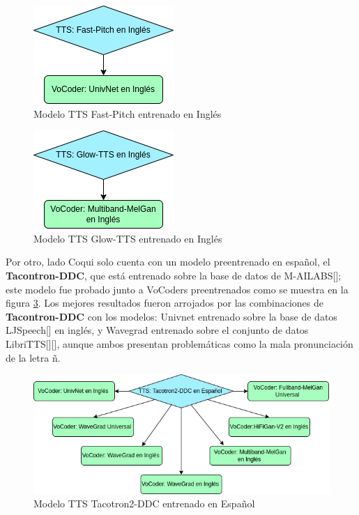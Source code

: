\begin{figure}[H]
	\centering
	\includegraphics[width=0.3\linewidth]{Graphics/en_fastpitch}
	\caption{Modelo TTS Fast-Pitch entrenado en Inglés}
	\label{en_fastpitch}
\end{figure}
\begin{figure}[H]
	\centering
	\includegraphics[width=0.3\linewidth]{Graphics/en_glowtts}
	\caption{Modelo TTS Glow-TTS entrenado en Inglés}
	\label{en_glowtts}
\end{figure}


Por otro, lado Coqui solo cuenta con un modelo preentrenado en español, el \textbf{Tacontron-DDC}, que está entrenado sobre la base de datos de M-AILABS[\cite{mailabs}]; este modelo fue probado junto a VoCoders preentrenados como se muestra en la figura \ref{es_tacotron}. Los mejores resultados fueron arrojados por las combinaciones de \textbf{Tacontron-DDC} con los modelos: Univnet entrenado sobre la base de datos LJSpeech[\cite{ljspeech}] en inglés, y Wavegrad entrenado sobre el conjunto de datos LibriTTS[\cite{libritts}][\cite{libritts1}], aunque ambos presentan problemáticas como la mala pronunciación de la letra ñ.

\begin{figure}[H]
	\centering
	\includegraphics[width=0.8\linewidth]{Graphics/es_tacotron}
	\caption{Modelo TTS Tacotron2-DDC entrenado en Español}
	\label{es_tacotron}
\end{figure}


